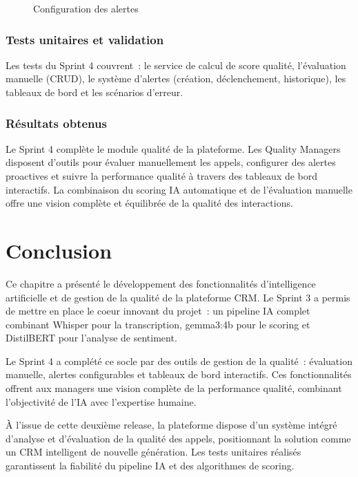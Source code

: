 \begin{figure}[H]
    \centering
    \caption{Configuration des alertes}
    \label{fig:sprint4_alert_config}
\end{figure}

\subsubsection{Tests unitaires et validation}

Les tests du Sprint 4 couvrent~: le service de calcul de score qualité, l'évaluation
manuelle (CRUD), le système d'alertes (création, déclenchement, historique), les
tableaux de bord et les scénarios d'erreur.

\subsubsection{Résultats obtenus}

Le Sprint 4 complète le module qualité de la plateforme. Les Quality Managers disposent
d'outils pour évaluer manuellement les appels, configurer des alertes proactives et
suivre la performance qualité à travers des tableaux de bord interactifs. La combinaison
du scoring IA automatique et de l'évaluation manuelle offre une vision complète et
équilibrée de la qualité des interactions.

\section*{Conclusion}
\label{sec:chap5_conclusion}

Ce chapitre a présenté le développement des fonctionnalités d'intelligence artificielle
et de gestion de la qualité de la plateforme CRM. Le Sprint 3 a permis de mettre en place
le coeur innovant du projet~: un pipeline IA complet combinant Whisper pour la transcription,
gemma3:4b pour le scoring et DistilBERT pour l'analyse de sentiment.

Le Sprint 4 a complété ce socle par des outils de gestion de la qualité~: évaluation manuelle,
alertes configurables et tableaux de bord interactifs. Ces fonctionnalités offrent aux
managers une vision complète de la performance qualité, combinant l'objectivité de l'IA
avec l'expertise humaine.

À l'issue de cette deuxième release, la plateforme dispose d'un système intégré d'analyse
et d'évaluation de la qualité des appels, positionnant la solution comme un CRM intelligent
de nouvelle génération. Les tests unitaires réalisés garantissent la fiabilité du pipeline
IA et des algorithmes de scoring.
